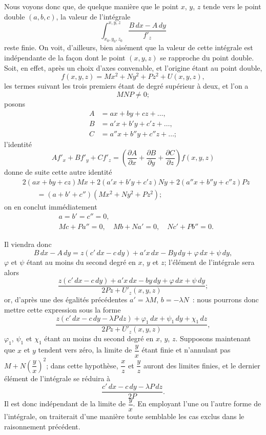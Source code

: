 \documentclass{article}
\begin{document}
Nous voyons donc que, de quelque manière que le point $x$, $y$, $z$ tende vers le point double $(a, b, c)$, la valeur de l'intégrale
\[
\int_{x_{0}, y_{0}, z_{0}}^{x, y, z} \frac{B\,dx - A\,dy}{f'_{z}}
\]
reste finie. On voit, d'ailleurs, bien aisément que la valeur de cette intégrale est indépendante de la façon dont le point $(x, y, z)$ se rapproche du point double. Soit, en effet, après un choix d'axes convenable, et l'origine étant au point double,
\[
f(x, y, z) = Mx^{2} + Ny^{2} + Pz^{2} + U(x, y, z),
\]
les termes suivant les trois premiers étant de degré supérieur à deux, et l'on a
\[
MNP \neq 0;
\]
posons
\[
\begin{aligned}
A &= ax + by + cz + \ldots, \\
B &= a'x + b'y + c'z + \ldots, \\
C &= a''x + b''y + c''z + \ldots;
\end{aligned}
\]
l'identité
\[
A f'_{x} + B f'_{y} + C f'_{z} = \left( \frac{\partial A}{\partial x} + \frac{\partial B}{\partial y} + \frac{\partial C}{\partial z} \right) f(x, y, z)
\]
donne de suite cette autre identité
\[
\begin{aligned}
&2(ax + by + cz)Mx + 2(a'x + b'y + c'z)Ny + 2(a''x + b''y + c''z)Pz \\
&\qquad = (a + b' + c'')(Mx^{2} + Ny^{2} + Pz^{2});
\end{aligned}
\]
on en conclut immédiatement
\[
\begin{aligned}
&a = b' = c'' = 0, \\
&Mc + Pa'' = 0, \quad Mb + Na' = 0, \quad Nc' + Pb'' = 0.
\end{aligned}
\]

Il viendra donc
\[
B\,dx - A\,dy = z(c'\,dx - c\,dy) + a'x\,dx - By\,dy + \varphi\,dx + \psi\,dy,
\]
$\varphi$ et $\psi$ étant au moins du second degré en $x$, $y$ et $z$; l'élément de l'intégrale sera alors
\[
\frac{z(c'\,dx - c\,dy) + a'x\,dx - by\,dy + \varphi\,dx + \psi\,dy}{2Pz + U'_{z}(x, y, z)};
\]
or, d'après une des égalités précédentes $a' = \lambda M$, $b = -\lambda N$~: nous pourrons donc mettre cette expression sous la forme
\[
\frac{z(c'\,dx - c\,dy - \lambda P\,dz) + \varphi_{1}\,dx + \psi_{1}\,dy + \chi_{1}\,dz}{2Pz + U'_{z}(x, y, z)},
\]
$\varphi_{1}$, $\psi_{1}$ et $\chi_{1}$ étant au moins du second degré en $x$, $y$, $z$. Supposons maintenant que $x$ et $y$ tendent vers zéro, la limite de $\dfrac{y}{x}$ étant finie et n'annulant pas $M + N\left(\dfrac{y}{x}\right)^{2}$; dans cette hypothèse, $\dfrac{x}{z}$ et $\dfrac{y}{z}$ auront des limites finies, et le dernier élément de l'intégrale se réduira à
\[
\frac{c'\,dx - c\,dy - \lambda P\,dz}{2P}.
\]
Il est donc indépendant de la limite de $\dfrac{y}{x}$. En employant l'une ou l'autre forme de l'intégrale, on traiterait d'une manière toute semblable les cas exclus dans le raisonnement précédent.
\end{document}
